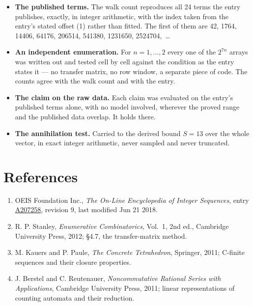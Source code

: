 \documentclass[11pt]{article}
\theoremstyle{definition}
\begin{document}
\begin{itemize}

\item {\bfseries The published terms.} The walk count reproduces all 24 terms the entry publishes, exactly, in integer arithmetic, with the index taken from the entry's stated offset (1) rather than fitted. The first of them are 42, 1764, 14406, 64176, 206514, 541380, 1231650, 2524704,~\dots

\item {\bfseries An independent enumeration.} For $n = 1,\dots,2$ every one of the $2^{7n}$ arrays was written out and tested cell by cell against the condition as the entry states it --- no transfer matrix, no row window, a separate piece of code. The counts agree with the walk count and with the entry.

\item {\bfseries The claim on the raw data.} Each claim was evaluated on the entry's published terms alone, with no model involved, wherever the proved range and the published data overlap. It holds there.

\item {\bfseries The annihilation test.} Carried to the derived bound $S = 13$ over the whole vector, in exact integer arithmetic, never sampled and never truncated.

\end{itemize}

\section{References}

\begin{enumerate}

\item OEIS Foundation Inc., \emph{The On-Line Encyclopedia of Integer Sequences}, entry \href{https://oeis.org/A207258}{A207258}, revision 9, last modified Jun 21 2018.

\item R. P. Stanley, \emph{Enumerative Combinatorics}, Vol.~1, 2nd ed., Cambridge University Press, 2012; \S4.7, the transfer-matrix method.

\item M. Kauers and P. Paule, \emph{The Concrete Tetrahedron}, Springer, 2011; C-finite sequences and their closure properties.

\item J. Berstel and C. Reutenauer, \emph{Noncommutative Rational Series with Applications}, Cambridge University Press, 2011; linear representations of counting automata and their reduction.

\end{enumerate}
\end{document}
